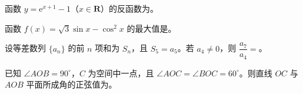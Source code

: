 \begin{question}
函数 $y=\mathrm e^{x+1}-1$（$x\in\mathbf R$）的反函数为\gkblank{}。

\end{question}
\begin{question}
函数 $f(x)=\sqrt3\sin x-\cos^2x$ 的最大值是\gkblank{}。

\end{question}
\begin{question}
设等差数列 $\{a_n\}$ 的前 $n$ 项和为 $S_n$，且 $S_5=a_5$。若 $a_4\neq0$，则 $\dfrac{a_7}{a_4}=$\gkblank{}。

\end{question}
\begin{question}
已知 $\angle AOB=90^\circ$，$C$ 为空间中一点，且 $\angle AOC=\angle BOC=60^\circ$。则直线 $OC$ 与 $AOB$ 平面所成角的正弦值为\gkblank{}。

\end{question}

